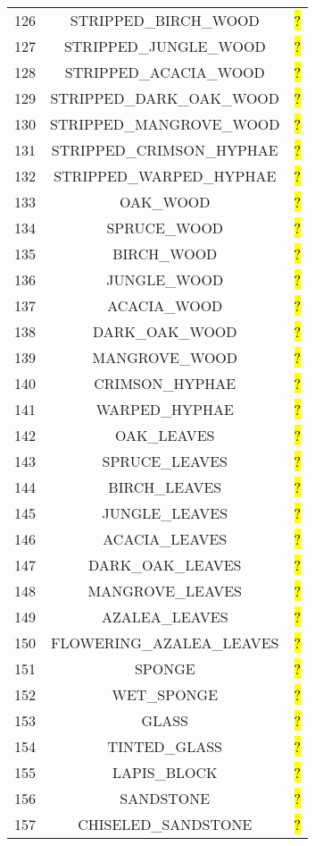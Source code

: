 \documentclass[11pt]{article}
\newcommand\myworries[1]{\sethlcolor{red}\hl{#1}}
\begin{document}
\begin{longtable}{ |c|c|c| }
	126 & STRIPPED\_BIRCH\_WOOD & \myworries{?} \\
	127 & STRIPPED\_JUNGLE\_WOOD & \myworries{?} \\
	128 & STRIPPED\_ACACIA\_WOOD & \myworries{?} \\
	129 & STRIPPED\_DARK\_OAK\_WOOD & \myworries{?} \\
	130 & STRIPPED\_MANGROVE\_WOOD & \myworries{?} \\
	131 & STRIPPED\_CRIMSON\_HYPHAE & \myworries{?} \\
	132 & STRIPPED\_WARPED\_HYPHAE & \myworries{?} \\
	133 & OAK\_WOOD & \myworries{?} \\
	134 & SPRUCE\_WOOD & \myworries{?} \\
	135 & BIRCH\_WOOD & \myworries{?} \\
	136 & JUNGLE\_WOOD & \myworries{?} \\
	137 & ACACIA\_WOOD & \myworries{?} \\
	138 & DARK\_OAK\_WOOD & \myworries{?} \\
	139 & MANGROVE\_WOOD & \myworries{?} \\
	140 & CRIMSON\_HYPHAE & \myworries{?} \\
	141 & WARPED\_HYPHAE & \myworries{?} \\
	142 & OAK\_LEAVES & \myworries{?} \\
	143 & SPRUCE\_LEAVES & \myworries{?} \\
	144 & BIRCH\_LEAVES & \myworries{?} \\
	145 & JUNGLE\_LEAVES & \myworries{?} \\
	146 & ACACIA\_LEAVES & \myworries{?} \\
	147 & DARK\_OAK\_LEAVES & \myworries{?} \\
	148 & MANGROVE\_LEAVES & \myworries{?} \\
	149 & AZALEA\_LEAVES & \myworries{?} \\
	150 & FLOWERING\_AZALEA\_LEAVES & \myworries{?} \\
	151 & SPONGE & \myworries{?} \\
	152 & WET\_SPONGE & \myworries{?} \\
	153 & GLASS & \myworries{?} \\
	154 & TINTED\_GLASS & \myworries{?} \\
	155 & LAPIS\_BLOCK & \myworries{?} \\
	156 & SANDSTONE & \myworries{?} \\
	157 & CHISELED\_SANDSTONE & \myworries{?} \\

\end{longtable}
\end{document}
